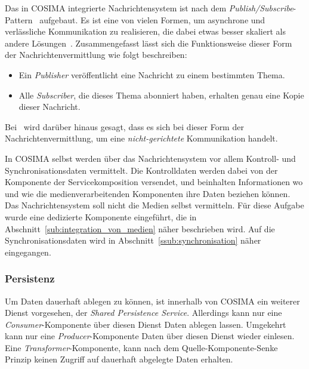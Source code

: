   Das in COSIMA integrierte Nachrichtensystem ist nach dem \emph{Publish/Subscribe}-Pattern~\citep[S. 106]{enterprise_integration_patterns} aufgebaut. Es ist eine von vielen Formen, um asynchrone und verlässliche Kommunikation zu realisieren, die dabei etwas besser skaliert als andere Lösungen~\citep[S. 69]{web_services_principles_and_technology}. Zusammengefasst lässt sich die Funktionsweise dieser Form der Nachrichtenvermittlung wie folgt beschreiben:
  
  \begin{itemize}
    \item Ein \emph{Publisher} veröffentlicht eine Nachricht zu einem bestimmten Thema.
    \item Alle \emph{Subscriber}, die dieses Thema abonniert haben, erhalten genau eine Kopie dieser Nachricht.
  \end{itemize}
  
  Bei~\citep[S. 127]{soa_goes_real} wird darüber hinaus gesagt, dass es sich bei dieser Form der Nachrichtenvermittlung, um eine \emph{nicht-gerichtete} Kommunikation handelt.
  
  In COSIMA selbst werden über das Nachrichtensystem vor allem Kontroll- und Synchronisationsdaten vermittelt. Die Kontrolldaten werden dabei von der Komponente der Servicekomposition versendet, und beinhalten Informationen wo und wie die medienverarbeitenden Komponenten ihre Daten beziehen können. Das Nachrichtensystem soll nicht die Medien selbst vermitteln. Für diese Aufgabe wurde eine dedizierte Komponente eingeführt, die in Abschnitt~\ref{sub:integration_von_medien} näher beschrieben wird. Auf die Synchronisationsdaten wird in Abschnitt~\ref{ssub:synchronisation} näher eingegangen.
  

\subsubsection{Persistenz} %
\label{ssub:persistenz}

  Um Daten dauerhaft ablegen zu können, ist innerhalb von COSIMA ein weiterer Dienst vorgesehen, der \emph{Shared Persistence Service}. Allerdings kann nur eine \emph{Consumer}-Komponente über diesen Dienst Daten ablegen lassen. Umgekehrt kann nur eine \emph{Producer}-Komponente Daten über diesen Dienst wieder einlesen. Eine \emph{Transformer}-Komponente, kann nach dem Quelle-Komponente-Senke Prinzip keinen Zugriff auf dauerhaft abgelegte Daten erhalten.
  

